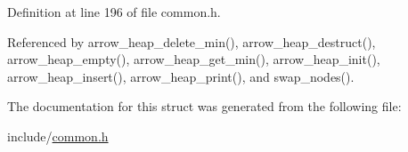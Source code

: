 Definition at line 196 of file common.h.

Referenced by arrow\_\-heap\_\-delete\_\-min(), arrow\_\-heap\_\-destruct(), arrow\_\-heap\_\-empty(), arrow\_\-heap\_\-get\_\-min(), arrow\_\-heap\_\-init(), arrow\_\-heap\_\-insert(), arrow\_\-heap\_\-print(), and swap\_\-nodes().

The documentation for this struct was generated from the following file:\begin{CompactItemize}
\item 
include/\hyperlink{common_8h}{common.h}\end{CompactItemize}
